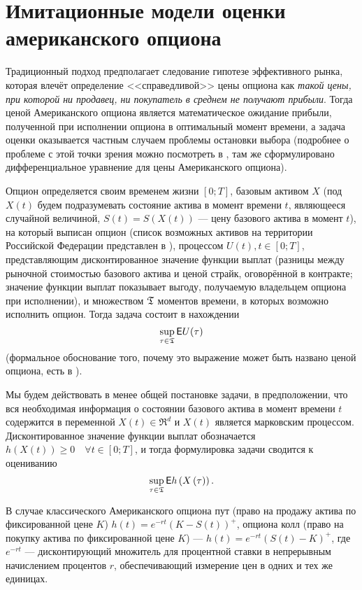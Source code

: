 \chapter{Имитационные модели оценки американского опциона}

Традиционный подход предполагает следование гипотезе эффективного рынка, которая влечёт определение <<справедливой>> цены опциона как \emph{такой цены, при которой ни продавец, ни покупатель в среднем не получают прибыли}. Тогда ценой Американского опциона является математическое ожидание прибыли, полученной при исполнении опциона в оптимальный момент времени, а задача оценки оказывается частным случаем проблемы остановки выбора (подробнее о проблеме с этой точки зрения можно посмотреть в \cite{Peskir2006}, там же сформулировано дифференциальное уравнение для цены Американского опциона).

Опцион определяется своим временем жизни $[0;T]$, базовым активом $X$ (под $X(t)$ будем подразумевать состояние актива в момент времени $t$, являющееся случайной величиной, $S(t) = S(X(t))$ --- цену базового актива в момент $t$), на который выписан опцион (список возможных активов на территории Российской Федерации представлен в \cite{fsfr}), процессом $U(t), t\in [0;T]$, представляющим дисконтированное значение функции выплат (разницы между рыночной стоимостью базового актива и ценой страйк, оговорённой в контракте; значение функции выплат показывает выгоду, получаемую владельцем опциона при исполнении), и множеством $\mathfrak{T}$ моментов времени, в которых возможно исполнить опцион. Тогда задача состоит в нахождении 
\begin{equation}\label{eq:supremum_of_expectation}
	\sup_{\tau\in\mathfrak{T}} \mathsf{E} U(\tau)
\end{equation}
(формальное обоснование того, почему это выражение может быть названо ценой опциона, есть в \cite{Duffie2001}).

Мы будем действовать в менее общей постановке задачи, в предположении, что вся необходимая информация о состоянии базового актива в момент времени $t$ содержится в переменной $X(t)\in \mathfrak{R}^d$ и $X(t)$ является марковским процессом. Дисконтированное значение функции выплат обозначается $h\left(X\left(t\right)\right) \geq 0 \quad\forall t\in \left[0;T\right]$, и тогда формулировка задачи сводится к оцениванию $$\sup_{\tau\in\mathfrak{T}}\mathsf{E} h\left(X\left(\tau\right)\right).$$

В случае классического Американского опциона пут (право на продажу актива по фиксированной цене $K$) $h(t) = e^{-rt}\left(K-S\left(t\right)\right)^+$, опциона колл (право на покупку актива по фиксированной цене $K$) --- $h(t) = e^{-rt}\left(S\left(t\right) - K\right)^+$, где $e^{-rt}$ --- дисконтирующий множитель для процентной ставки в непрерывным начислением процентов $r$, обеспечивающий измерение цен в одних и тех же единицах.

